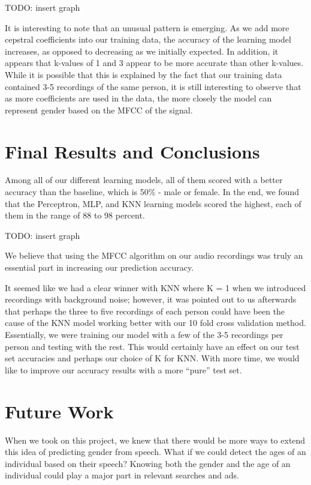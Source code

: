\documentclass{article}
\begin{document}
TODO: insert graph

It is interesting to note that an unusual pattern is emerging.  As we add more cepstral coefficients into our training data, the accuracy of the learning model increases, as opposed to decreasing as we initially expected.  In addition, it appears that k-values of 1 and 3 appear to be more accurate than other k-values.  While it is possible that this is explained by the fact that our training data contained 3-5 recordings of the same person, it is still interesting to observe that as more coefficients are used in the data, the more closely the model can represent gender based on the MFCC of the signal.

\section{Final Results and Conclusions}

Among all of our different learning models, all of them scored with a better accuracy than the baseline, which is 50\% - male or female. In the end, we found that the Perceptron, MLP, and KNN learning models scored the highest, each of them in the range of  88 to 98 percent.

TODO: insert graph

We believe that using the MFCC algorithm on our audio recordings was truly an essential part in increasing our prediction accuracy.

It seemed like we had a clear winner with KNN where K = 1 when we introduced recordings with background noise; however, it was pointed out to us afterwards that perhaps the three to five recordings of each person could have been the cause of the KNN model working better with our 10 fold cross validation method. Essentially, we were training our model with a few of the 3-5 recordings per person and testing with the rest. This would certainly have an effect on our test set accuracies and perhaps our choice of K for KNN. With more time, we would like to improve our accuracy results with a more “pure” test set.

\section{Future Work}

When we took on this project, we knew that there would be more ways to extend this idea of predicting gender from speech. What if we could detect the ages of an individual based on their speech? Knowing both the gender and the age of an individual could play a major part in relevant searches and ads.
\end{document}
